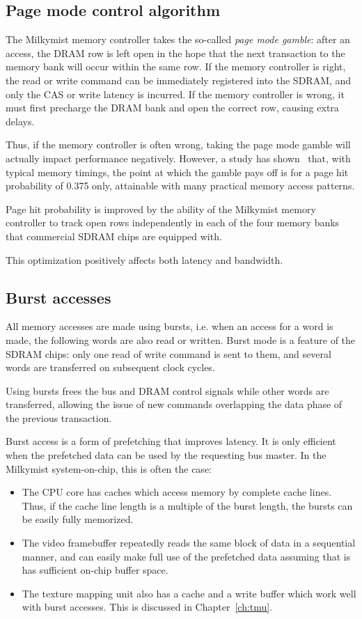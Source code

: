 \documentclass[a4paper,11pt]{kthesis}
\begin{document}
\subsection{Page mode control algorithm}
The Milkymist memory controller takes the so-called \textit{page mode gamble}: after an access, the DRAM row is left open in the hope that the next transaction to the memory bank will occur within the same row. If the memory controller is right, the read or write command can be immediately registered into the SDRAM, and only the CAS or write latency is incurred. If the memory controller is wrong, it must first precharge the DRAM bank and open the correct row, causing extra delays.

Thus, if the memory controller is often wrong, taking the page mode gamble will actually impact performance negatively. However, a study has shown~\cite{pagemode} that, with typical memory timings, the point at which the gamble pays off is for a page hit probability of 0.375 only, attainable with many practical memory access patterns.

Page hit probability is improved by the ability of the Milkymist memory controller to track open rows independently in each of the four memory banks that commercial SDRAM chips are equipped with.

This optimization positively affects both latency and bandwidth.

\subsection{Burst accesses}
\label{subsec:fmlburst}
All memory accesses are made using bursts, i.e. when an access for a word is made, the following words are also read or written. Burst mode is a feature of the SDRAM chips: only one read of write command is sent to them, and several words are transferred on subsequent clock cycles.

Using bursts frees the bus and DRAM control signals while other words are transferred, allowing the issue of new commands overlapping the data phase of the previous transaction.

Burst access is a form of prefetching that improves latency. It is only efficient when the prefetched data can be used by the requesting bus master. In the Milkymist system-on-chip, this is often the case:
\begin{itemize}
\item The CPU core has caches which access memory by complete cache lines. Thus, if the cache line length is a multiple of the burst length, the bursts can be easily fully memorized.
\item The video framebuffer repeatedly reads the same block of data in a sequential manner, and can easily make full use of the prefetched data assuming that is has sufficient on-chip buffer space.
\item The texture mapping unit also has a cache and a write buffer which work well with burst accesses. This is discussed in Chapter~\ref{ch:tmu}.
\end{itemize}
\end{document}
